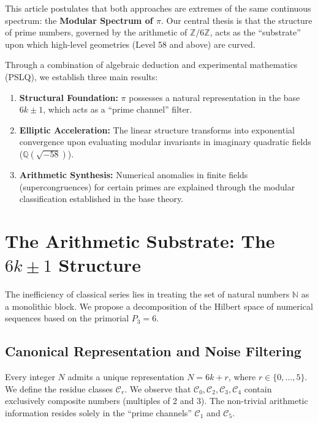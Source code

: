 \documentclass[12pt, a4paper]{article}
\theoremstyle{plain}
\theoremstyle{definition}
\theoremstyle{remark}
\numberwithin{equation}{section}
\begin{document}
This article postulates that both approaches are extremes of the same continuous spectrum: the \textbf{Modular Spectrum of $\pi$}. Our central thesis is that the structure of prime numbers, governed by the arithmetic of $\mathbb{Z}/6\mathbb{Z}$, acts as the ``substrate'' upon which high-level geometries (Level 58 and above) are curved.

Through a combination of algebraic deduction and experimental mathematics (PSLQ), we establish three main results:
\begin{enumerate}
    \item \textbf{Structural Foundation:} $\pi$ possesses a natural representation in the base $6k \pm 1$, which acts as a ``prime channel'' filter.
    \item \textbf{Elliptic Acceleration:} The linear structure transforms into exponential convergence upon evaluating modular invariants in imaginary quadratic fields ($\mathbb{Q}(\sqrt{-58})$).
    \item \textbf{Arithmetic Synthesis:} Numerical anomalies in finite fields (supercongruences) for certain primes are explained through the modular classification established in the base theory.
\end{enumerate}

\section{The Arithmetic Substrate: The $6k \pm 1$ Structure}
\label{sec:sustrato}
The inefficiency of classical series lies in treating the set of natural numbers $\mathbb{N}$ as a monolithic block. We propose a decomposition of the Hilbert space of numerical sequences based on the primorial $P_3 = 6$.

\subsection{Canonical Representation and Noise Filtering}

Every integer $N$ admits a unique representation $N = 6k + r$, where $r \in \{0, \dots, 5\}$. We define the residue classes $\mathcal{C}_r$. We observe that $\mathcal{C}_0, \mathcal{C}_2, \mathcal{C}_3, \mathcal{C}_4$ contain exclusively composite numbers (multiples of 2 and 3). The non-trivial arithmetic information resides solely in the ``prime channels'' $\mathcal{C}_1$ and $\mathcal{C}_5$.
\end{document}
